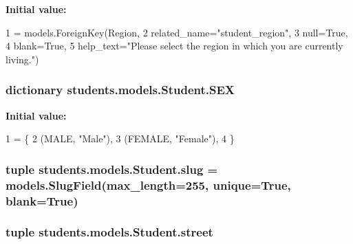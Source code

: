 {\bfseries Initial value\-:}
\begin{DoxyCode}
1 = models.ForeignKey(Region,
2                                related\_name=\textcolor{stringliteral}{"student\_region"},
3                                null=\textcolor{keyword}{True},
4                                blank=\textcolor{keyword}{True},
5                                help\_text=\textcolor{stringliteral}{"Please select the region in which you are currently living."})
\end{DoxyCode}
\hypertarget{classstudents_1_1models_1_1_student_a2a85491d6d3ae6efdbdd58da14ec01fa}{
\subsubsection[{S\-E\-X}]{\setlength{\rightskip}{0pt plus 5cm}dictionary students.\-models.\-Student.\-S\-E\-X\hspace{0.3cm}{\ttfamily [static]}}}\label{classstudents_1_1models_1_1_student_a2a85491d6d3ae6efdbdd58da14ec01fa}
{\bfseries Initial value\-:}
\begin{DoxyCode}
1 = \{
2         (MALE, \textcolor{stringliteral}{"Male"}),
3         (FEMALE, \textcolor{stringliteral}{"Female"}),
4     \}
\end{DoxyCode}
\hypertarget{classstudents_1_1models_1_1_student_ad676823e45f40a8f3bd16e2cb2a96946}{
\subsubsection[{slug}]{\setlength{\rightskip}{0pt plus 5cm}tuple students.\-models.\-Student.\-slug = models.\-Slug\-Field(max\-\_\-length=255, unique=True, blank=True)\hspace{0.3cm}{\ttfamily [static]}}}\label{classstudents_1_1models_1_1_student_ad676823e45f40a8f3bd16e2cb2a96946}
\hypertarget{classstudents_1_1models_1_1_student_a389b723936a0a1ca5f8327563c1a7187}{
\subsubsection[{street}]{\setlength{\rightskip}{0pt plus 5cm}tuple students.\-models.\-Student.\-street\hspace{0.3cm}{\ttfamily [static]}}}\label{classstudents_1_1models_1_1_student_a389b723936a0a1ca5f8327563c1a7187}
